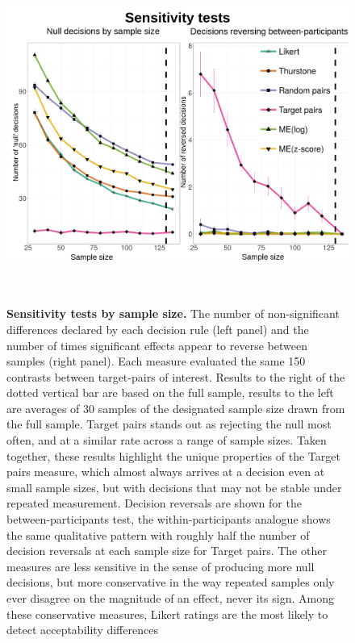\documentclass[doc]{apa6}
\newcommand{\targchoice}{{\sc Target pairs}}
\newcommand{\likert}{{\sc Likert}}
\begin{document}
\begin{figure}[t]
\centering
\includegraphics[height=11cm,keepaspectratio]{figures/nulls_and_reversals.png}
\caption{{\small {\bf Sensitivity tests by sample size.} The number of non-significant differences declared by each decision rule (left panel) and the number of times significant effects appear to reverse between samples (right panel). Each measure evaluated the same 150 contrasts between target-pairs of interest. Results to the right of the dotted vertical bar are based on the full sample, results to the left are averages of 30 samples of the designated sample size drawn from the full sample. \targchoice{} stands out as rejecting the null most often, and at a similar rate across a range of sample sizes. Taken together, these results highlight the unique properties of the \targchoice{} measure, which almost always arrives at a decision even at small sample sizes, but with decisions that may not be stable under repeated measurement. Decision reversals are shown for the between-participants test, the within-participants analogue shows the same qualitative pattern with roughly half the number of decision reversals at each sample size for \targchoice.
The other measures are less sensitive in the sense of producing more null decisions, but more conservative in the way repeated samples only ever disagree on the magnitude of an effect, never its sign. Among these conservative measures, \likert{} ratings are the most likely to detect acceptability differences
}}
\label{decision_nullresults}
\end{figure}
\end{document}
